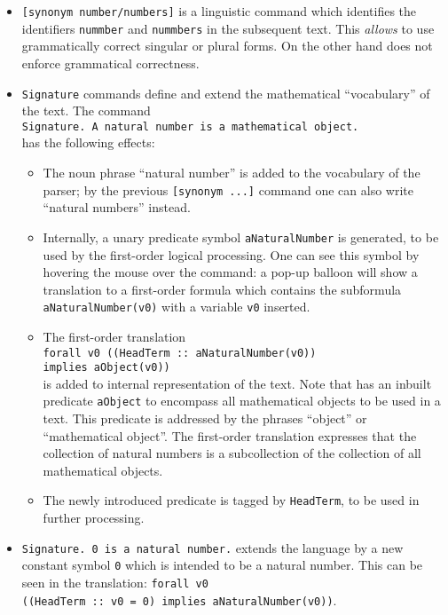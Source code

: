 \documentclass[11pt]{article}
\begin{document}
\begin{itemize}

\item \verb+[synonym number/numbers]+ is a linguistic command which
identifies the identifiers \verb+nummber+ and \verb+nummbers+ in the
subsequent text. This \textit{allows} to use grammatically correct singular
or plural forms. On the other hand \Naproche{} does not enforce grammatical
correctness.

\item \verb+Signature+ commands define and extend the mathematical
``vocabulary'' of the text. The command
\\\verb+Signature. A natural number is a mathematical object.+\\
has the following effects:
\begin{itemize}
\item The noun phrase ``natural number'' is added to
the vocabulary of the parser; by the previous \verb+[synonym ...]+
command one can also write ``natural numbers'' instead.
\item Internally, a unary predicate symbol
\verb+aNaturalNumber+ is generated, to be used by the first-order
logical processing. One can see this symbol by hovering the mouse
over the command: a pop-up balloon will show a translation to a
first-order formula which contains the subformula
\verb+aNaturalNumber(v0)+ with a variable \verb+v0+ inserted.
\item The first-order translation\\
\verb+forall v0 ((HeadTerm :: aNaturalNumber(v0))+\\
\verb+implies aObject(v0))+\\
is added to internal representation of the text. Note that
\Naproche{} has an inbuilt predicate \verb+aObject+ to encompass
all mathematical objects to be used in a text. This predicate is
addressed by the phrases ``object'' or ``mathematical object''.
The first-order
translation expresses that the collection of natural numbers is
a subcollection of the collection of all mathematical objects.
\item The newly introduced predicate is tagged by \verb+HeadTerm+,
to be used in further processing.
\end{itemize}

\item \verb+Signature. 0 is a natural number.+ extends the
language by a new constant symbol \verb+0+ which is intended to be
a natural number. This can be seen in the translation:
\verb+forall v0+\\
\verb+((HeadTerm :: v0 = 0) implies aNaturalNumber(v0))+.


\end{itemize}
\end{document}
